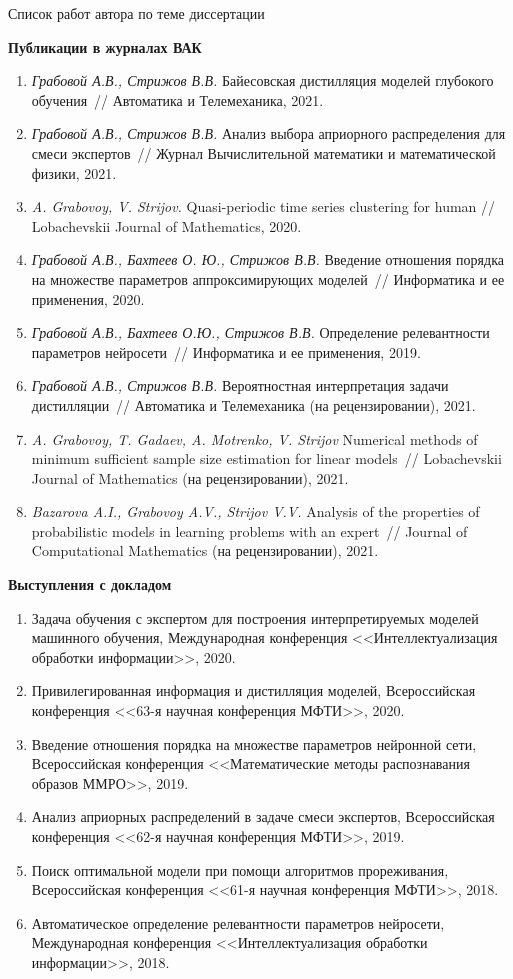 \documentclass[10pt,pdf,hyperref={unicode}]{beamer}
\begin{document}
\begin{frame}{Список работ автора по теме диссертации}
\justifying
{
\scriptsize
\textbf{Публикации в журналах ВАК}

\begin{enumerate}
    \item \textit{Грабовой А.В., Стрижов В.В.} Байесовская дистилляция моделей глубокого обучения~// Автоматика и Телемеханика, 2021.
    \item \textit{Грабовой А.В., Стрижов В.В.} Анализ выбора априорного распределения для смеси экспертов~// Журнал Вычислительной математики и математической физики, 2021.
    \item \textit{A. Grabovoy, V. Strijov.} Quasi-periodic time series clustering for human // Lobachevskii Journal of Mathematics, 2020.
    \item \textit{Грабовой А.В., Бахтеев О. Ю., Стрижов В.В.} Введение отношения порядка на множестве параметров аппроксимирующих моделей~// Информатика и ее применения, 2020.
    \item \textit{Грабовой А.В., Бахтеев О.Ю., Стрижов В.В.} Определение релевантности параметров нейросети~// Информатика и ее применения, 2019.
    \item \textit{Грабовой А.В., Стрижов В.В.} Вероятностная интерпретация задачи дистилляции~// Автоматика и Телемеханика (на рецензировании), 2021.
    \item \textit{A. Grabovoy, T. Gadaev, A. Motrenko, V. Strijov} Numerical methods of minimum sufficient sample size estimation for linear models~// Lobachevskii Journal of Mathematics (на рецензировании), 2021.
    \item \textit{Bazarova A.I., Grabovoy A.V., Strijov V.V.} Analysis of the properties of probabilistic models in learning problems with an expert~// Journal of Computational Mathematics (на рецензировании), 2021.
\end{enumerate}

\textbf{Выступления с докладом}
\begin{enumerate}
    \item Задача обучения с экспертом для построения интерпретируемых моделей машинного обучения, Международная конференция <<Интеллектуализация обработки информации>>, 2020.
    \item Привилегированная информация и дистилляция моделей, Всероссийская конференция <<63-я научная конференция МФТИ>>, 2020.
    \item Введение отношения порядка на множестве параметров нейронной сети, Всероссийская конференция <<Математические методы распознавания образов ММРО>>, 2019.
    \item Анализ априорных распределений в задаче смеси экспертов, Всероссийская конференция <<62-я научная конференция МФТИ>>, 2019.
    \item Поиск оптимальной модели при помощи алгоритмов прореживания, Всероссийская конференция <<61-я научная конференция МФТИ>>, 2018.
    \item Автоматическое определение релевантности параметров нейросети, Международная конференция <<Интеллектуализация обработки информации>>, 2018.
\end{enumerate}
}
\end{frame}
\end{document}
